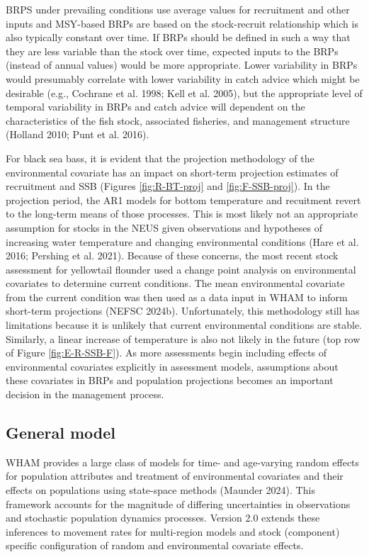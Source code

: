 \documentclass[
]{article}
\begin{document}
BRPS under prevailing conditions use average values for recruitment and other inputs and MSY-based BRPs are based on the stock-recruit relationship which is also typically constant over time. If BRPs should be defined in such a way that they are less variable than the stock over time, expected inputs to the BRPs (instead of annual values) would be more appropriate. Lower variability in BRPs would presumably correlate with lower variability in catch advice which might be desirable (e.g., Cochrane et al. 1998; Kell et al. 2005), but the appropriate level of temporal variability in BRPs and catch advice will dependent on the characteristics of the fish stock, associated fisheries, and management structure (Holland 2010; Punt et al. 2016).

For black sea bass, it is evident that the projection methodology of the environmental covariate has an impact on short-term projection estimates of recruitment and SSB (Figures \ref{fig:R-BT-proj} and \ref{fig:F-SSB-proj}). In the projection period, the AR1 models for bottom temperature and recuitment revert to the long-term means of those processes. This is most likely not an appropriate assumption for stocks in the NEUS given observations and hypotheses of increasing water temperature and changing environmental conditions (Hare et al. 2016; Pershing et al. 2021). Because of these concerns, the most recent stock assessment for yellowtail flounder used a change point analysis on environmental covariates to determine current conditions. The mean environmental covariate from the current condition was then used as a data input in WHAM to inform short-term projections (NEFSC 2024b). Unfortunately, this methodology still has limitations because it is unlikely that current environmental conditions are stable. Similarly, a linear increase of temperature is also not likely in the future (top row of Figure \ref{fig:E-R-SSB-F}). As more assessments begin including effects of environmental covariates explicitly in assessment models, assumptions about these covariates in BRPs and population projections becomes an important decision in the management process.

\hypertarget{general-model}{%
\subsection*{General model}\label{general-model}}

WHAM provides a large class of models for time- and age-varying random effects for population attributes and treatment of environmental covariates and their effects on populations using state-space methods (Maunder 2024). This framework accounts for the magnitude of differing uncertainties in observations and stochastic population dynamics processes. Version 2.0 extends these inferences to movement rates for multi-region models and stock (component) specific configuration of random and environmental covariate effects.
\end{document}
